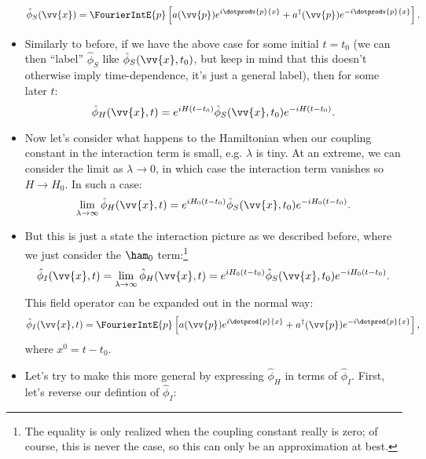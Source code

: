 \begin{itemize}
        \begin{equation*}
            \hat{\phi}_S(\vv{x}) = \FourierIntE{p} \left[ a(\vv{p}) e^{i\dotprodv{p}{x}} + a^{\dagger}(\vv{p})e^{-i\dotprodv{p}{x}} \right].
        \end{equation*}
    \item Similarly to before, if we have the above case for some initial $t=t_0$ (we can then ``label'' $\hat{\phi}_S$ like $\hat{\phi}_S(\vv{x},t_0)$, but keep in mind that this doesn't otherwise imply time-dependence, it's just a general label), then for some later $t$:
        \begin{equation}
            \hat{\phi}_H(\vv{x},t) = e^{iH(t-t_0)} \hat{\phi}_S(\vv{x},t_0) e^{-iH(t-t_0)}.\label{eq:SPandHPFieldRelation}
        \end{equation}
    \item Now let's consider what happens to the Hamiltonian when our coupling constant in the interaction term is small, e.g. $\lambda$ is tiny. At an extreme, we can consider the limit as $\lambda \rightarrow 0$, in which case the interaction term vanishes so $H \rightarrow H_0$. In such a case:
        \begin{equation*}
            \lim_{\lambda \rightarrow \infty} \hat{\phi}_H(\vv{x},t) = e^{iH_0(t-t_0)} \hat{\phi}_S(\vv{x},t_0) e^{-iH_0(t-t_0)}.
        \end{equation*}
    \item But this is just a state the interaction picture as we described before, where we just consider the $\ham_0$ term:\footnote{The equality is only realized when the coupling constant really is zero; of course, this is never the case, so this can only be an approximation at best.}
        \begin{equation}
            \hat{\phi}_I(\vv{x},t) = \lim_{\lambda \rightarrow \infty} \hat{\phi}_H(\vv{x},t) = e^{iH_0(t-t_0)} \hat{\phi}_S(\vv{x},t_0) e^{-iH_0(t-t_0)}.
        \end{equation}
        This field operator can be expanded out in the normal way:
        \begin{equation}
            \hat{\phi}_I(\vv{x},t) = \FourierIntE{p} \left[ a(\vv{p})e^{i\dotprod{p}{x}} + a^{\dagger}(\vv{p})e^{-i\dotprod{p}{x}} \right],
        \end{equation}
        where $x^0 = t-t_0$.
    \item Let's try to make this more general by expressing $\hat{\phi}_H$ in terms of $\hat{\phi}_I$. First, let's reverse our defintion of $\hat{\phi}_I$:

\end{itemize}
